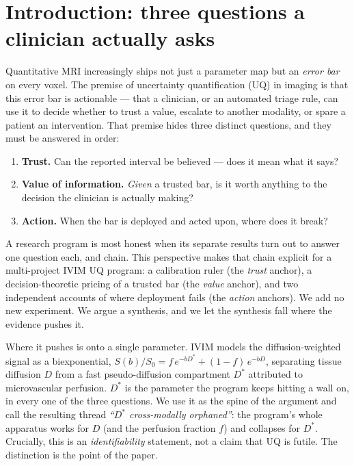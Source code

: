 \documentclass[11pt]{article}
\newcommand{\Dstar}{D^{*}}
\begin{document}
\section{Introduction: three questions a clinician actually asks}\label{sec:intro}
Quantitative MRI increasingly ships not just a parameter map but an \emph{error bar} on every
voxel. The premise of uncertainty quantification (UQ) in imaging is that this error bar is
actionable --- that a clinician, or an automated triage rule, can use it to decide whether to
trust a value, escalate to another modality, or spare a patient an intervention. That premise
hides three distinct questions, and they must be answered in order:

\begin{enumerate}
\item \textbf{Trust.} Can the reported interval be believed --- does it mean what it says?
\item \textbf{Value of information.} \emph{Given} a trusted bar, is it worth anything to the
decision the clinician is actually making?
\item \textbf{Action.} When the bar is deployed and acted upon, where does it break?
\end{enumerate}

A research program is most honest when its separate results turn out to answer one question
each, and chain. This perspective makes that chain explicit for a multi-project IVIM UQ program:
a calibration ruler (the \emph{trust} anchor), a decision-theoretic pricing of a trusted bar
(the \emph{value} anchor), and two independent accounts of where deployment fails (the
\emph{action} anchors). We add no new experiment. We argue a synthesis, and we let the synthesis
fall where the evidence pushes it.

Where it pushes is onto a single parameter. IVIM models the diffusion-weighted signal as a
biexponential, $S(b)/S_0 = f\,e^{-b\Dstar} + (1-f)\,e^{-bD}$, separating tissue diffusion $D$
from a fast pseudo-diffusion compartment $\Dstar$ attributed to microvascular perfusion. $\Dstar$
is the parameter the program keeps hitting a wall on, in every one of the three questions. We use
it as the spine of the argument and call the resulting thread \emph{``$\Dstar$ cross-modally
orphaned''}: the program's whole apparatus works for $D$ (and the perfusion fraction $f$) and
collapses for $\Dstar$. Crucially, this is an \emph{identifiability} statement, not a claim that
UQ is futile. The distinction is the point of the paper.
\end{document}
